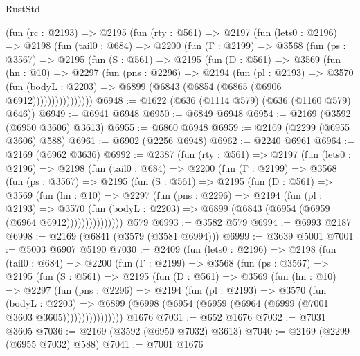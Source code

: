 \begin{lexlean}{RustStd}
\begin{coremodule}
    (fun (rc : @2193) =>
    @2195
      (fun (rty : @561) =>
      @2197
        (fun (lets0 : @2196) =>
        @2198
          (fun (tail0 : @684) =>
          @2200
            (fun (Γ : @2199) =>
            @3568
              (fun (ps : @3567) =>
              @2195
                (fun (S : @561) =>
                @2195
                  (fun (D : @561) =>
                  @3569
                    (fun (hn : @10) =>
                    @2297
                      (fun (pns : @2296) =>
                      @2194
                        (fun (pl : @2193) =>
                        @3570
                          (fun (bodyL : @2203) =>
                          @6899 (@6843 (@6854 (@6865 (@6906 @6912))))))))))))))))
@6948 := @1622 (@636 (@1114 @579) (@636 (@1160 @579) @646))
@6949 := @6941 @6948
@6950 := @6849 @6948
@6954 := @2169 (@3592 (@6950 @3606) @3613)
@6955 := @6860 @6948
@6959 := @2169 (@2299 (@6955 @3606) @588)
@6961 := @6902 (@2256 @6948)
@6962 := @2240 @6961
@6964 := @2169 (@6962 @3636)
@6992 := @2387
    (fun (rty : @561) =>
    @2197
      (fun (lets0 : @2196) =>
      @2198
        (fun (tail0 : @684) =>
        @2200
          (fun (Γ : @2199) =>
          @3568
            (fun (ps : @3567) =>
            @2195
              (fun (S : @561) =>
              @2195
                (fun (D : @561) =>
                @3569
                  (fun (hn : @10) =>
                  @2297
                    (fun (pns : @2296) =>
                    @2194
                      (fun (pl : @2193) =>
                      @3570
                        (fun (bodyL : @2203) =>
                        @6899 (@6843 (@6954 (@6959 (@6964 @6912)))))))))))))))
    @579
@6993 := @3582 @579
@6994 := @6993 @2187
@6998 := @2169 (@6841 (@3579 (@3581 @6994)))
@6999 := @3639 @5001
@7001 := @5003 @6907 @5190
@7030 := @2409
    (fun (lets0 : @2196) =>
    @2198
      (fun (tail0 : @684) =>
      @2200
        (fun (Γ : @2199) =>
        @3568
          (fun (ps : @3567) =>
          @2195
            (fun (S : @561) =>
            @2195
              (fun (D : @561) =>
              @3569
                (fun (hn : @10) =>
                @2297
                  (fun (pns : @2296) =>
                  @2194
                    (fun (pl : @2193) =>
                    @3570
                      (fun (bodyL : @2203) =>
                      @6899 (@6998 (@6954 (@6959 (@6964 (@6999 (@7001 @3603 @3605))))))))))))))))
    @1676
@7031 := @652 @1676
@7032 := @7031 @3605
@7036 := @2169 (@3592 (@6950 @7032) @3613)
@7040 := @2169 (@2299 (@6955 @7032) @588)
@7041 := @7001 @1676

\end{coremodule}
\end{lexlean}

